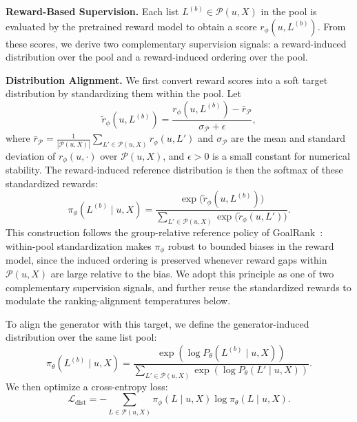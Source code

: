 \documentclass[sigconf]{acmart}
\begin{document}
\vspace{0.5em}
\noindent\textbf{Reward-Based Supervision.}
Each list $L^{(b)} \in \mathcal{P}(u, X)$ in the pool is evaluated by the
pretrained reward model to obtain a score $r_\phi(u, L^{(b)})$. From these scores, we derive two complementary supervision signals: a reward-induced distribution over the pool and a reward-induced ordering over the pool.

\vspace{0.5em}
\noindent\textbf{Distribution Alignment.}
We first convert reward scores into a soft target distribution by 
standardizing them within the pool. Let
\begin{equation}
\label{eq:standardized_reward}
\tilde{r}_\phi(u, L^{(b)})
= \frac{r_\phi(u, L^{(b)}) - \bar{r}_\mathcal{P}}{\sigma_\mathcal{P} + \epsilon},
\end{equation}
where $\bar{r}_\mathcal{P} = \frac{1}{|\mathcal{P}(u, X)|} \sum_{L' \in \mathcal{P}(u, X)} r_\phi(u, L')$ and $\sigma_\mathcal{P}$ are the mean and standard deviation of $r_\phi(u, \cdot)$ over $\mathcal{P}(u, X)$, and $\epsilon > 0$ is a small constant for numerical stability. The reward-induced reference distribution is then the softmax of these standardized rewards:
\begin{equation}
\label{eq:pi_phi}\pi_{\phi}(L^{(b)} \mid u, X)
=
\frac{\exp\!\bigl( \tilde{r}_\phi(u, L^{(b)}) \bigr)}
{\sum_{L' \in \mathcal{P}(u, X)} \exp\!\bigl( \tilde{r}_\phi(u, L') \bigr)}.
\end{equation}
This construction follows the group-relative reference policy of GoalRank~\cite{zhang2025goalrank}: within-pool standardization makes $\pi_\phi$ robust to bounded biases in the reward model, since the induced ordering is preserved whenever reward gaps within $\mathcal{P}(u, X)$ are large relative to the bias. We adopt this principle as one of two complementary supervision signals, and further reuse the standardized rewards to modulate the ranking-alignment temperatures below.

To align the generator with this target, we define the generator-induced distribution over the same list pool:
\begin{equation}
\pi_{\theta}(L^{(b)} \mid u, X)
=
\frac{\exp\!\left(\log P_\theta(L^{(b)} \mid u, X)\right)}
{\sum_{L' \in \mathcal{P}(u, X)} \exp\!\left(\log P_\theta(L' \mid u, X)\right)}.
\end{equation}
We then optimize a cross-entropy loss:
\begin{equation}
\mathcal{L}_{\mathrm{dist}}
=
-\sum_{L \in \mathcal{P}(u, X)}
\pi_{\phi}(L \mid u, X)\log \pi_{\theta}(L \mid u, X).
\end{equation}
\end{document}
